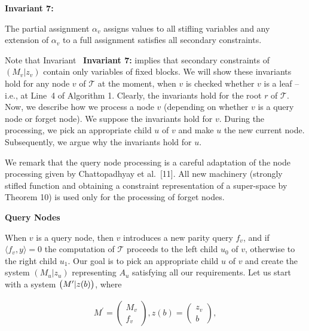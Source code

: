 \textbf{ Invariant 7:}



The partial assignment $\alpha_{v}$ assigns values to all stifling variables and any extension of $\alpha_{v}$ to a full assignment satisfies all secondary constraints.\par







Note that Invariant \textbf{ Invariant 7:} implies that secondary constraints of $(M_{v}|z_{v})$ contain only variables of fixed blocks.
We will show these invariants hold for any node $v$ of $\mathcal{T}$ at the moment, when $v$ is checked whether $v$ is a leaf – i.e., at Line 4 of Algorithm 1.
Clearly, the invariants hold for the root $r$ of $\mathcal{T}$.
Now, we describe how we process a node $v$ (depending on whether $v$ is a query node or forget node).
We suppose the invariants hold for $v$.
During the processing, we pick an appropriate child $u$ of $v$ and make $u$ the new current node.
Subsequently, we argue why the invariants hold for $u$.\par




We remark that the query node processing is a careful adaptation of the node processing given by Chattopadhyay et al. [11].
All new machinery (strongly stifled function and obtaining a constraint representation of a super-space by Theorem 10) is used only for the processing of forget nodes.\par





\par\medskip\noindent\textbf{Query Nodes}\par




When $v$ is a query node, then $v$ introduces a new parity query $f_{v}$, and if $\langle f_{v},y\rangle=0$ the computation of $\mathcal{T}$ proceeds to the left child $u_{0}$ of $v$, otherwise to the right child $u_{1}$.
Our goal is to pick an appropriate child $u$ of $v$ and create the system $(M_{u}|z_{u})$ representing $A_{u}$ satisfying all our requirements.
Let us start with a system $\bigl{(}M^{\prime}|z(b)\bigr{)}$, where\par


\[\begin{gathered}
M^{\prime}=\begin{pmatrix}M_{v}\\
f_{v}\end{pmatrix},z(b)=\begin{pmatrix}z_{v}\\
b\end{pmatrix},
\end{gathered}\]


